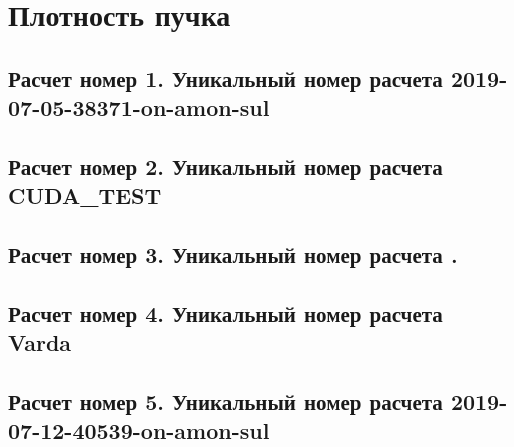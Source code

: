 \documentclass[a4paper,14pt]{extreport}
\begin{document}
\section{Плотность пучка}
\clearpage 
 \subsection{Расчет номер 1. Уникальный номер расчета 2019-07-05-38371-on-amon-sul}
\clearpage 
 \subsection{Расчет номер 2. Уникальный номер расчета CUDA_TEST}
\clearpage 
 \subsection{Расчет номер 3. Уникальный номер расчета .}
\clearpage 
 \subsection{Расчет номер 4. Уникальный номер расчета Varda}
\clearpage 
 \subsection{Расчет номер 5. Уникальный номер расчета 2019-07-12-40539-on-amon-sul}
 
\end{document}
